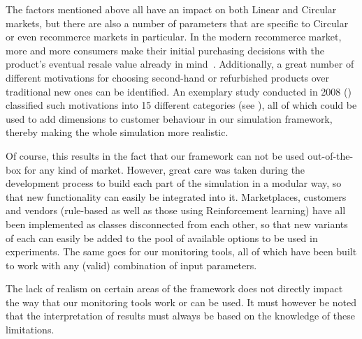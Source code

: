 The factors mentioned above all have an impact on both Linear and Circular markets, but there are also a number of parameters that are specific to Circular or even recommerce markets in particular. In the modern recommerce market, more and more consumers make their initial purchasing decisions with the product's eventual resale value already in mind~\cite{ShoppingResaleValue}. Additionally, a great number of different motivations for choosing second-hand or refurbished products over traditional new ones can be identified. An exemplary study conducted in 2008 (\cite{SecondHandMotives}) classified such motivations into 15 different categories (see ), all of which could be used to add dimensions to customer behaviour in our simulation framework, thereby making the whole simulation more realistic.

Of course, this results in the fact that our framework can not be used out-of-the-box for any kind of market. However, great care was taken during the development process to build each part of the simulation in a modular way, so that new functionality can easily be integrated into it. Marketplaces, customers and vendors (rule-based as well as those using Reinforcement learning) have all been implemented as classes disconnected from each other, so that new variants of each can easily be added to the pool of available options to be used in experiments. The same goes for our monitoring tools, all of which have been built to work with any (valid) combination of input parameters.

The lack of realism on certain areas of the framework does not directly impact the way that our monitoring tools work or can be used. It must however be noted that the interpretation of results must always be based on the knowledge of these limitations.